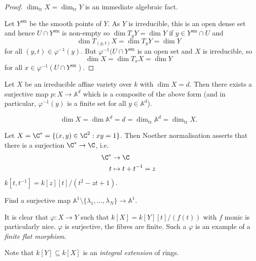 \documentclass[a4paper]{article}
\renewcommand{\A}{\mathbb{A}}
\begin{document}
\begin{proof}
  \(\dim_{\text{tr}} X = \dim_{\text{tr}} Y\) is an immediate algebraic fact.

  Let \(Y^{\text{sm}}\) be the smooth points of \(Y\). As \(Y\) is irreducible, this is an open dense set and hence \(U \cap Y^{\text{sm}}\) is non-empty so \(\dim T_y Y = \dim Y\) if \(y \in Y^{\text{sm}} \cap U\) and
  \[
    \dim T_{(y, t)}X = \dim T_yY = \dim Y
  \]
  for all \((y, t) \in \varphi^{-1}(y)\). But \(\varphi^{-1}(U \cap Y^{\text{sm}}\) is an open set and \(X\) is irreducible, so
  \[
    \dim X = \dim T_xX = \dim Y
  \]
  for all \(x \in \varphi^{-1}(U \cap Y^{\text{sm}})\).
\end{proof}

\begin{theorem}
  Let \(X\) be an irreducible affine variety over \(k\) with \(\dim X = d\). Then there exists a surjective map \(p: X \to \A^d\) which is a composite of the above form (and in particular, \(\varphi^{-1}(y)\) is a finite set for all \(y \in \A^d\)).
\end{theorem}

\begin{corollary}
  \[
    \dim X = \dim \A^d = d = \dim_{\text{tr}} \A^d = \dim_{\text{tr}} X.
  \]
\end{corollary}

\begin{eg}
  Let \(X = \C^* = \{(x, y) \in \C^2: xy = 1\}\). Then Noether normalisation asserts that there is a surjection \(\C^* \to \C\), i.e.
  \begin{align*}
    \C^* &\to \C \\
    t &\mapsto t + t^{-1} = z
  \end{align*}
  \(k[t, t^{-1}] = k[z][t]/(t^2 - zt + 1)\).
\end{eg}

\begin{ex}
  Find a surjective map \(\A^1 \setminus \{\lambda_1, \dots, \lambda_N\} \to \A^1\).
\end{ex}

It is clear that \(\varphi: X \to Y\) such that \(k[X] = k[Y][t]/(f(t))\) with \(f\) monic is particularly nice. \(\varphi\) is surjective, the fibres are finite. Such a \(\varphi\) is an example of a \emph{finite flat morphism}.

Note that \(k[Y] \subseteq k[X]\) is an \emph{integral extension} of rings.
\end{document}

